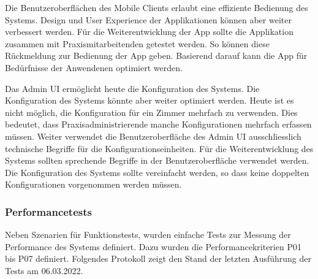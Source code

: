 Die Benutzeroberflächen des Mobile Clients erlaubt eine effiziente Bedienung des Systems.
Design und User Experience der Applikationen können aber weiter verbessert werden.
Für die Weiterentwicklung der App sollte die Applikation zusammen mit Praxismitarbeitenden getestet werden.
So können diese Rückmeldung zur Bedienung der App geben.
Basierend darauf kann die App für Bedürfnisse der Anwendenen optimiert werden.

Das Admin UI ermöglicht heute die Konfiguration des Systems.
Die Konfiguration des Systems könnte aber weiter optimiert werden.
Heute ist es nicht möglich, die Konfiguration für ein Zimmer mehrfach zu verwenden.
Dies bedeutet, dass Praxisadministrierende manche Konfigurationen mehrfach erfassen müssen.
Weiter verwendet die Benutzeroberfläche des Admin UI ausschliesslich technische Begriffe für die Konfigurationseinheiten.
Für die Weiterentwicklung des Systems sollten sprechende Begriffe in der Benutzeroberfläche verwendet werden.
Die Konfiguration des Systems sollte vereinfacht werden, so dass keine doppelten Konfigurationen vorgenommen werden müssen.

\clearpage

\subsubsection{Performancetests}

Neben Szenarien für Funktionstests, wurden einfache Tests zur Messung der Performance des Systems definiert.
Dazu wurden die Performancekriterien P01 bis P07 definiert.
Folgendes Protokoll zeigt den Stand der letzten Ausführung der Tests am 06.03.2022.

